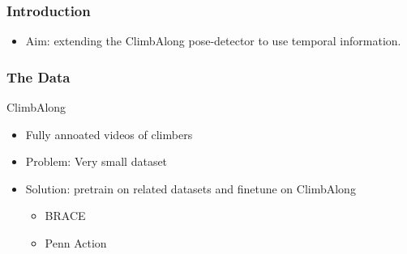 \documentclass{beamer}
\begin{document}
\begin{frame}
    \frametitle{Introduction}
    \begin{itemize}
        \item<1-> Aim: extending the ClimbAlong pose-detector to use temporal information.
    \end{itemize}
\end{frame}

\begin{frame}
    \frametitle{The Data}
    \begin{minipage}{0.5\textwidth}
        ClimbAlong
        \begin{itemize}
            \item Fully annoated videos of climbers
            \item<2-> Problem: Very small dataset
            \item<3-> Solution: pretrain on related datasets and finetune on ClimbAlong
            \begin{itemize}
                \item BRACE
                \item Penn Action
            \end{itemize}
        \end{itemize}
    \end{minipage} \hfill
    \begin{minipage}{0.45\textwidth}
        \begin{figure}
            \center

\end{figure}
\end{minipage}
\end{frame}
\end{document}
